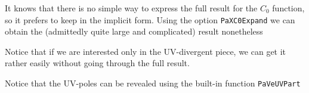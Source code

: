 \documentclass[../FeynHelpersManual.tex]{subfiles}
\begin{document}
It knows that there is no simple way to express the full result for the
\(C_0\) function, so it prefers to keep in the implicit form. Using the
option \texttt{PaXC0Expand} we can obtain the (admittedly quite large
and complicated) result nonetheless

\begin{Shaded}
\begin{Highlighting}[]
\OperatorTok{[}\OperatorTok{[}\OperatorTok{,} \OperatorTok{,} \OperatorTok{,} \OperatorTok{\{}\OperatorTok{[}\OperatorTok{,} \OperatorTok{],}\OperatorTok{[}\OperatorTok{,} \OperatorTok{],} \SpecialCharTok{\^{}}\OperatorTok{\},} \OperatorTok{\{}\SpecialCharTok{\^{}}\OperatorTok{,} \SpecialCharTok{\^{}}\OperatorTok{,} \SpecialCharTok{\^{}}\OperatorTok{\}],}\OtherTok{{-}\textgreater{}} \OperatorTok{]}
\end{Highlighting}
\end{Shaded}

Notice that if we are interested only in the UV-divergent piece, we can
get it rather easily without going through the full result.

\begin{Shaded}
\begin{Highlighting}[]
\OperatorTok{[}\OperatorTok{[}\OperatorTok{,} \OperatorTok{,} \OperatorTok{,} \OperatorTok{\{}\OperatorTok{[}\OperatorTok{,} \OperatorTok{],}\OperatorTok{[}\OperatorTok{,} \OperatorTok{],} \SpecialCharTok{\^{}}\OperatorTok{\},} \OperatorTok{\{}\SpecialCharTok{\^{}}\OperatorTok{,} \SpecialCharTok{\^{}}\OperatorTok{,} \SpecialCharTok{\^{}}\OperatorTok{\}],}\OtherTok{{-}\textgreater{}} \OperatorTok{]}
\end{Highlighting}
\end{Shaded}

Notice that the UV-poles can be revealed using the built-in function
\texttt{PaVeUVPart}
\end{document}
